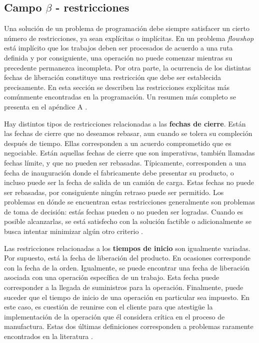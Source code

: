 \documentclass[spanish,draft,12pt,headsepline,footsepline,paper=letter]{scrreprt}
\begin{document}
\subsection{Campo $\beta$ - restricciones}

Una solución de un problema de programación debe siempre satisfacer un cierto número de restricciones, ya sean explícitas o implícitas. En un problema \textit{flowshop} está implícito que los trabajos deben ser procesados de acuerdo a una ruta definida y por consiguiente, una operación no puede comenzar mientras su precedente permanezca incompleta. 
Por otra parte, la ocurrencia de los distintas fechas de liberación constituye una restricción que debe ser establecida precisamente. En esta sección se describen las restricciones explícitas más comúnmente encontradas en la programación. Un resumen más completo se presenta en el apéndice A \citep[p.~9-10]{TKindt2002}. 

Hay distintos tipos de restricciones relacionadas a las \textbf{fechas de cierre}. Están las fechas de cierre que no deseamos rebasar, aun cuando se tolera su compleción después de tiempo. Ellas corresponden a un acuerdo comprometido que es negociable. Están aquellas fechas de cierre que son imperativas, también llamadas fechas límite, y que no pueden ser rebasadas. Típicamente, corresponden a una fecha de inauguración donde el fabricamente debe presentar su producto, o incluso puede ser la fecha de salida de un camión de carga. Estas fechas no puede ser rebasadas, por consiguiente ningún retraso puede ser permitido. Los problemas en dónde se encuentran estas restricciones generalmente son problemas de toma de decisión: estás fechas pueden o no pueden ser logradas. Cuando es posible alcanzarlas, se está satisfecho con la solución factible o adicionalmente se busca intentar minimizar algún otro criterio \citep[p.~10]{TKindt2002}.

Las restricciones relacionadas a los \textbf{tiempos de inicio} son igualmente variadas. Por supuesto, está la fecha de liberación del producto. En ocasiones corresponde con la fecha de la orden. Igualmente, se puede encontrar una fecha de liberación asociada con una operación específica de un trabajo. Esta fecha puede corresponder a la llegada de suministros para la operación. Finalmente, puede suceder que el tiempo de inicio de una operación en particular sea impuesto. En este caso, es cuestión de reunirse con el cliente para que atestigüe la implementación de la operación que él considera crítica en el proceso de manufactura. Estas dos últimas definiciones corresponden a problemas raramente encontrados en la literatura \citep[p.~10]{TKindt2002}.
\end{document}
